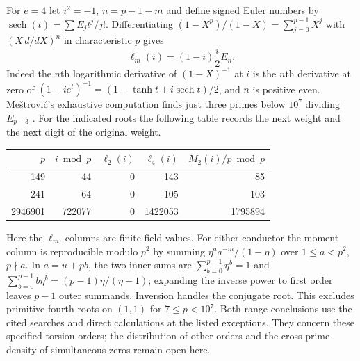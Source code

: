 For $e=4$ let $i^2=-1$, $n=p-1-m$ and define signed Euler numbers by
$\operatorname{sech}(t)=\sum E_jt^j/j!$. Differentiating
$(1-X^p)/(1-X)=\sum_{j=0}^{p-1}X^j$ with $(X\,d/dX)^n$ in
characteristic $p$ gives
\[
 \ell_m(i)=(1-i)\frac{i}{2}E_n .
\]
Indeed the $n$th logarithmic derivative of $(1-X)^{-1}$ at $i$
is the $n$th derivative at zero of
$(1-i e^t)^{-1}=(1-\tanh t+i\operatorname{sech} t)/2$,
and $n$ is positive even. Me\v{s}trovi\'c's exhaustive computation
finds just three primes below $10^7$ dividing $E_{p-3}$
\cite{Mestrovic}. For the indicated roots the following table records
the next weight and the next digit of the original weight.
\par\smallskip
{\centering
\begin{tabular}{@{}rrrrr@{}}
\toprule
$p$ & $i\bmod p$ & $\ell_2(i)$ & $\ell_4(i)$ & $M_2(i)/p\bmod p$\\
\midrule
149&44&0&143&85\\
241&64&0&105&103\\
2946901&722077&0&1422053&1795894\\
\bottomrule
\end{tabular}\par}
\smallskip
Here the $\ell_m$ columns are finite-field values. For either
conductor the moment column is reproducible modulo $p^2$ by summing
$\eta^a a^{-m}/(1-\eta)$ over $1\le a<p^2$, $p\nmid a$.
In $a=u+pb$, the two inner sums are
$\sum_{b=0}^{p-1}\eta^b=1$ and
$\sum_{b=0}^{p-1}b\eta^b=(p-1)\eta/(\eta-1)$; expanding the inverse
power to first order leaves $p-1$ outer summands. Inversion handles
the conjugate root. This excludes primitive fourth roots on $(1,1)$
for $7\le p<10^7$. Both range conclusions use the cited searches
and direct calculations at the listed exceptions. They concern these
specified torsion orders; the distribution of other orders and the
cross-prime density of simultaneous zeros remain open here.

